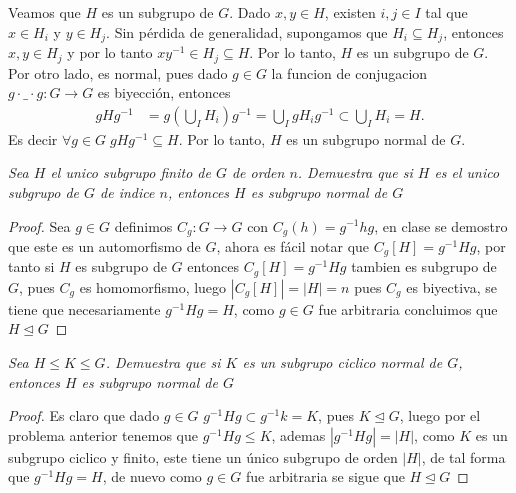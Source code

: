 \documentclass[11pt,letterpaper]{article}
\begin{document}
\begin{Solucion}
    Veamos que \(H\) es un subgrupo de \(G\). Dado \(x,y \in H\), existen \(i,j \in I\) tal que \(x \in H_i\) y \(y \in H_j\). 
    Sin pérdida de generalidad, supongamos que \(H_i \subseteq H_j\), entonces \(x,y \in H_j\) y 
    por lo tanto \(xy^{-1} \in H_j \subseteq H\). Por lo tanto, \(H\) es un subgrupo de \(G\). Por otro lado, es normal, pues dado \(g\in G\) 
    la funcion de conjugacion \(g \cdot \_ \cdot g : G \rightarrow G\) es  biyección, entonces 
    \begin{align*}
    gHg^{-1} &= g \left(\bigcup_I H_i\right) g^{-1} = \bigcup_I gH_ig^{-1} \subset \bigcup_I H_i = H.
    \end{align*}
    Es decir \(\forall g\in G\; gHg^{-1} \subseteq H\). Por lo tanto, \(H\) es un subgrupo normal de \(G\).
\end{Solucion}
\begin{tcolorbox}[
	title = \textcolor{black}{\textcolor{white}{Problema 4}},]
\textit{Sea $H$ el unico subgrupo finito de $G$ de orden $n$. Demuestra que si $H$ es el unico subgrupo
de $G$ de indice $n$, entonces $H$ es subgrupo normal de $G$
}
\end{tcolorbox}
\begin{proof}
   Sea $g\in G$ definimos $C_g:G\to G$ con $C_g(h)=g^{-1}hg$, en clase se demostro que este es un automorfismo de $G$, ahora es f\'acil notar que
   $C_g[H]=g^{-1}Hg$, por tanto si $H$ es subgrupo de $G$ entonces $C_g[H]=g^{-1}Hg$ tambien es subgrupo de $G$, pues $C_g$ es homomorfismo, luego $|C_g[H]|=|H|=n$ pues $C_g$ es biyectiva, se tiene que necesariamente $g^{-1}Hg=H$, como $g\in G$ fue arbitraria
   concluimos que $H\trianglelefteq G$ 
\end{proof}


\begin{tcolorbox}[
	title = \textcolor{black}{\textcolor{white}{Problema 5}},]
\textit{Sea $H\leq K\leq G$. Demuestra que si $K$ es un subgrupo ciclico normal de $G$, entonces $H$ es subgrupo normal de $G$}
\end{tcolorbox}
\begin{proof}
    Es claro que dado $g\in G$ $g^{-1}Hg\subset g^{-1}k =K$, pues $K\trianglelefteq G$, luego por el problema anterior tenemos que 
    $g^{-1}Hg\leq K$, ademas $|g^{-1}Hg|=|H|$, como $K$ es un subgrupo ciclico y finito, este tiene un \'unico subgrupo de orden $|H|$, de tal forma que
    $g^{-1}Hg=H$, de nuevo como $g\in G$ fue arbitraria se sigue que $H\trianglelefteq G$  
\end{proof}
\end{document}
